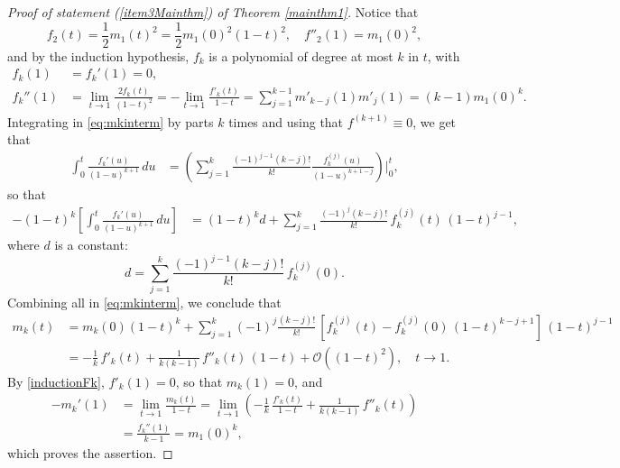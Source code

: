 \documentclass[reqno,11pt]{amsart}
\theoremstyle{plain}
\theoremstyle{definition}
\theoremstyle{remark}
\numberwithin{equation}{section}
\numberwithin{equation}{section}
\begin{document}
\begin{proof}[Proof of statement \textit{(\ref{item3Mainthm})} of Theorem \ref{mainthm1}]
Notice that
 $$
 f_2(t)= \frac{1}{2} m_1(t)^2= \frac{1}{2} m_1(0)^2(1-t)^2, \quad f''_2(1)=m_1(0)^2,
 $$
and by the induction hypothesis, $f_k$ is a polynomial of degree at most $k$ in $t$, with 
\begin{equation}
    \label{inductionFk}
    \begin{split}
f_k(1)& =f_k'(1)=0, \\ 
f_k''(1) &=\lim_{t\to 1}\frac{2f_k(t)}{(1-t)^2} =-\lim_{t\to 1}\frac{f'_k(t)}{1-t}  = \sum_{j=1}^{k-1} m'_{k-j}(1)  m'_j(1)=(k-1)m_1(0)^k.
\end{split}
\end{equation}
Integrating in \eqref{eq:mkinterm} by parts $k$ times and using that $f^{(k+1)}\equiv 0$, we get that
\begin{align*}
		\int_0^t   \frac{f_k'(u)}{ (1-u)^{k+1}} \,  du & =\left( \sum_{j=1}^{k} \frac{(-1)^{j-1}(k-j)!}{k!}\frac{f_k^{(j)}(u)}{(1-u)^{k+1-j}  }\right)\bigg|_0^t,
	\end{align*}
	so that
	\begin{align*}
		- (1-t)^{k} \left[  \int_0^t   \frac{f_k'(u)}{ (1-u)^{k+1}} \,  du\right] & =  (1-t)^{k} d  
		+    \sum_{j=1}^{k} \frac{(-1)^{j} (k-j)!}{k!}\, f_k^{(j)}(t)\, (1-t)^{j-1},
	\end{align*}
	where $d$ is a constant:
	$$
	d=   \sum_{j=1}^{k} \frac{(-1)^{j-1} (k-j)!}{k!} \, f_k^{(j)}(0).
	$$
	Combining all in \eqref{eq:mkinterm}, we conclude that
  \begin{align*}
       m_k(t) &  = m_k(0) (1-t)^{k} +  \sum_{j=1}^{k} (-1)^{j} \frac{(k-j)!}{k!}\, \left[ f_k^{(j)}(t) - f_k^{(j)}(0)\, (1-t)^{k-j+1} \right]\, (1-t)^{j-1}\\
        &= - \frac{  1}{k}\, f'_k (t)  + \frac{ 1}{k(k-1)}\, f''_k (t)\, (1-t) + \mathcal O((1-t)^2), \quad t\to 1.
  \end{align*}
By \eqref{inductionFk}, $f'_k(1)=0$, so that $m_k(1)=0$, and
\begin{align*}
-m_k'(1) & =\lim_{t\to 1}\frac{m_k(t)}{1-t}=  \lim_{t\to 1} \left( - \frac{  1}{k}\, \frac{f'_k (t)}{1-t}  + \frac{ 1}{k(k-1)}\, f''_k (t) \right)\\
& = \frac{f_k''(1)}{k-1} =  m_1(0)^k ,
\end{align*}
which proves the assertion.
\end{proof}
\end{document}
